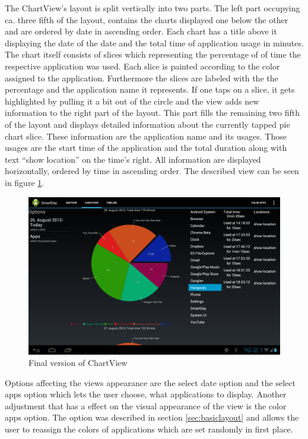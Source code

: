 The  ChartView's layout is split vertically into two parts. The left part occupying ca. three fifth of the layout, contains the charts displayed one below the other and are ordered by date in ascending order. Each chart has a title above it displaying the date of the date and the total time of application usage in minutes. The chart itself consists of slices which representing the percentage of of time the respective application was used. Each slice is painted according to the color assigned to the application. Furthermore the slices are labeled with the the percentage and the application name it represents. If one taps on a slice, it gets highlighted by pulling it a bit out of the circle and the view adds new information to the right part of the layout. This part fills the remaining two fifth of the layout and displays detailed information about the currently tapped pie chart slice. These information  are the application name and its usages. Those usages are the start time of the application and the total duration along with text ``show location'' on the time's right. All information are displayed horizontally, ordered by time in ascending order. The described view can be seen in figure \ref{fig:finalchartview}.
\begin{figure}
	\caption{Final version of ChartView}
	\label{fig:finalchartview}
	\includegraphics[width=\textwidth]{images/Screenshots/vfinal/Screenshot_2013-08-28-16-21-10.png}
\end{figure}


Options  affecting the views appearance are the select date option and the select apps option which lets the user choose, what applications to display. Another adjustment that has a effect on the visual appearance of the view is the color apps option. The option was described in section \ref{sec:basiclayout} and allows the user to reassign the colors of applications which are set randomly in first place.

